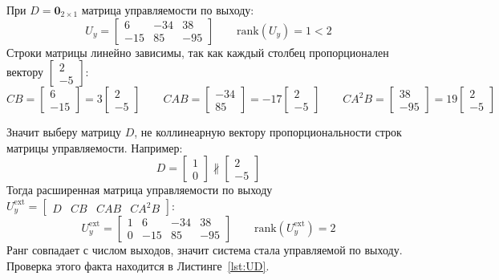 \documentclass[a4paper,12pt]{article}
\begin{document}
	При $D = \mathbf{0}_{2\times1}$ матрица управляемости по выходу:
	\[
	U_y = \begin{bmatrix}6 & -34 & 38\\-15 & 85 & -95\end{bmatrix} \qquad \text{rank}(U_y) = 1 < 2
	\]
	Строки матрицы линейно зависимы, так как каждый столбец пропорционален
	вектору $\begin{bmatrix}2\\-5\end{bmatrix}$:
	\[
	CB = \begin{bmatrix}6\\-15\end{bmatrix} = 3\begin{bmatrix}2\\-5\end{bmatrix} \qquad
	CAB = \begin{bmatrix}-34\\85\end{bmatrix} = -17\begin{bmatrix}2\\-5\end{bmatrix} \qquad
	CA^2B = \begin{bmatrix}38\\-95\end{bmatrix} = 19\begin{bmatrix}2\\-5\end{bmatrix}
	\]
	
	Значит выберу матрицу $D$, не коллинеарную вектору пропорциональности
	строк матрицы управляемости. Например:
	\[
	D = \begin{bmatrix}1\\0\end{bmatrix} \not\parallel \begin{bmatrix}2\\-5\end{bmatrix}
	\]
	Тогда расширенная матрица управляемости по выходу
	$U_y^{\text{ext}} = \begin{bmatrix} D & CB & CAB & CA^2B \end{bmatrix}$:
	\[
	U_y^{\text{ext}} = \begin{bmatrix}1 & 6 & -34 & 38\\0 & -15 & 85 & -95\end{bmatrix}
	\qquad \text{rank}\!\left(U_y^{\text{ext}}\right) = 2
	\]
	Ранг совпадает с числом выходов, значит система стала управляемой по выходу.
	Проверка этого факта находится в Листинге~\ref{lst:UD}.
	
\end{document}
